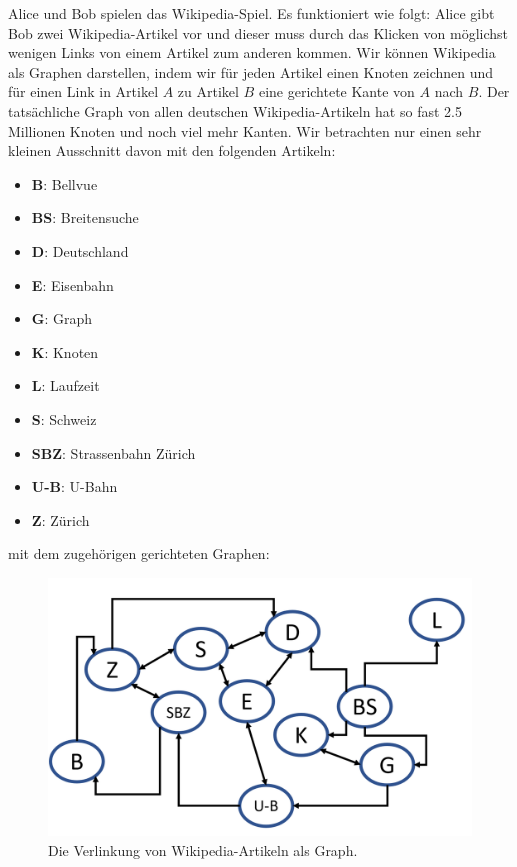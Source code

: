 Alice und Bob spielen das Wikipedia-Spiel. Es funktioniert wie folgt: Alice gibt Bob zwei Wikipedia-Artikel vor und dieser muss durch das Klicken von möglichst wenigen Links von einem Artikel zum anderen kommen. Wir können Wikipedia als Graphen darstellen, indem wir für jeden Artikel einen Knoten zeichnen und für einen Link in Artikel $A$ zu Artikel $B$ eine gerichtete Kante von $A$ nach $B$. Der tatsächliche Graph von allen deutschen Wikipedia-Artikeln hat so fast 2.5 Millionen Knoten und noch viel mehr Kanten. Wir betrachten nur einen sehr kleinen Ausschnitt davon mit den folgenden Artikeln:
\begin{multicols}{2}
\begin{itemize}
    \item {\bf{B}}: Bellvue
    \item {\bf{BS}}: Breitensuche
    \item {\bf{D}}: Deutschland
    \item {\bf{E}}: Eisenbahn
    \item {\bf{G}}: Graph
    \item {\bf{K}}: Knoten
    \item {\bf{L}}: Laufzeit
    \item {\bf{S}}: Schweiz
    \item {\bf{SBZ}}: Strassenbahn Zürich
    \item {\bf{U-B}}: U-Bahn
    \item {\bf{Z}}: Zürich
\end{itemize}

\end{multicols}
mit dem zugehörigen gerichteten Graphen:
\begin{figure}[h!]
    \centering
    \includegraphics[scale=0.5]{Pictures/Wikipedia.PNG} 
    \caption{Die Verlinkung von Wikipedia-Artikeln als Graph.}
    \label{fig:my_label}
\end{figure}

